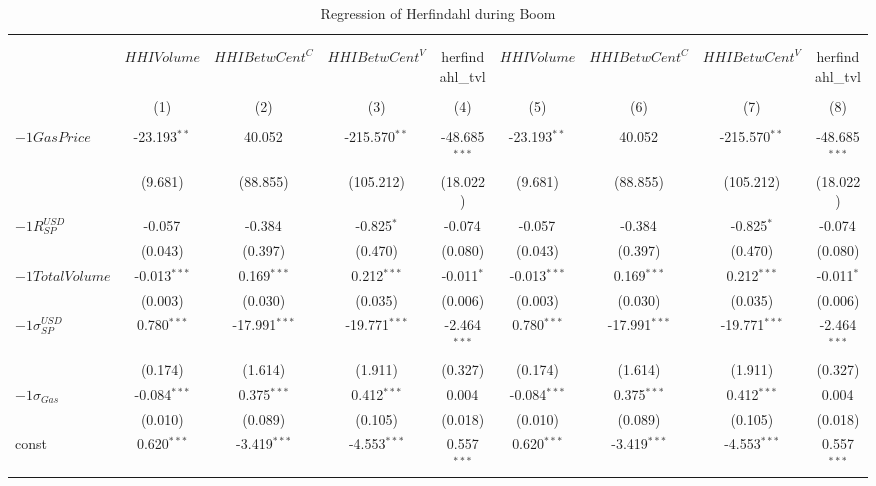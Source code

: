 \begin{table}[!htbp] \centering
  \caption{Regression of Herfindahl during Boom}
\begin{tabular}{@{\extracolsep{5pt}}lcccccccc}
\\[-1.8ex]\hline
\hline \\[-1.8ex]
\\[-1.8ex] & \multicolumn{1}{c}{${	 HHIVolume}$} & \multicolumn{1}{c}{${	 HHIBetwCent}^C$} & \multicolumn{1}{c}{${	 HHIBetwCent}^V$} & \multicolumn{1}{c}{herfindahl_tvl} & \multicolumn{1}{c}{${	 HHIVolume}$} & \multicolumn{1}{c}{${	 HHIBetwCent}^C$} & \multicolumn{1}{c}{${	 HHIBetwCent}^V$} & \multicolumn{1}{c}{herfindahl_tvl}  \\
\\[-1.8ex] & (1) & (2) & (3) & (4) & (5) & (6) & (7) & (8) \\
\hline \\[-1.8ex]
 ${	-1 GasPrice}$ & -23.193$^{**}$ & 40.052$^{}$ & -215.570$^{**}$ & -48.685$^{***}$ & -23.193$^{**}$ & 40.052$^{}$ & -215.570$^{**}$ & -48.685$^{***}$ \\
  & (9.681) & (88.855) & (105.212) & (18.022) & (9.681) & (88.855) & (105.212) & (18.022) \\
 ${	-1 R}^{USD}_{SP}$ & -0.057$^{}$ & -0.384$^{}$ & -0.825$^{*}$ & -0.074$^{}$ & -0.057$^{}$ & -0.384$^{}$ & -0.825$^{*}$ & -0.074$^{}$ \\
  & (0.043) & (0.397) & (0.470) & (0.080) & (0.043) & (0.397) & (0.470) & (0.080) \\
 ${	-1 TotalVolume}$ & -0.013$^{***}$ & 0.169$^{***}$ & 0.212$^{***}$ & -0.011$^{*}$ & -0.013$^{***}$ & 0.169$^{***}$ & 0.212$^{***}$ & -0.011$^{*}$ \\
  & (0.003) & (0.030) & (0.035) & (0.006) & (0.003) & (0.030) & (0.035) & (0.006) \\
 ${	-1 \sigma}^{USD}_{SP}$ & 0.780$^{***}$ & -17.991$^{***}$ & -19.771$^{***}$ & -2.464$^{***}$ & 0.780$^{***}$ & -17.991$^{***}$ & -19.771$^{***}$ & -2.464$^{***}$ \\
  & (0.174) & (1.614) & (1.911) & (0.327) & (0.174) & (1.614) & (1.911) & (0.327) \\
 ${	-1 \sigma}_{Gas}$ & -0.084$^{***}$ & 0.375$^{***}$ & 0.412$^{***}$ & 0.004$^{}$ & -0.084$^{***}$ & 0.375$^{***}$ & 0.412$^{***}$ & 0.004$^{}$ \\
  & (0.010) & (0.089) & (0.105) & (0.018) & (0.010) & (0.089) & (0.105) & (0.018) \\
 const & 0.620$^{***}$ & -3.419$^{***}$ & -4.553$^{***}$ & 0.557$^{***}$ & 0.620$^{***}$ & -3.419$^{***}$ & -4.553$^{***}$ & 0.557$^{***}$ \\

\end{tabular}
\end{table}
